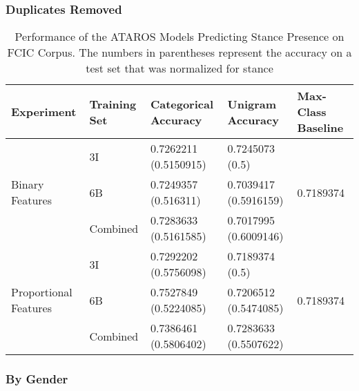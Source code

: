 \newpage 
\subsubsection*{Duplicates Removed}

\begin{table}[h]
\centering
\begin{tabular}{l | l | l | l | l  } 
	\textbf{Experiment}  & \textbf{Training Set} & \textbf{Categorical Accuracy} &  \textbf{Unigram Accuracy} & \textbf{Max-Class Baseline} \\ 
	\hline 
	\multirow{3}{*}{Binary Features}
		& 3I & \num{0.7262211} (\num{0.5150915}) & \num{0.7245073} (\num{0.5}) & \multirow{3}{*}{\num{0.7189374}} \\ 
	    & 6B & \num{0.7249357} (\num{0.516311}) & \num{0.7039417} (\num{0.5916159}) & \\ 
	    & Combined & \num{0.7283633} (\num{0.5161585}) & \num{0.7017995} (\num{0.6009146}) & \\  
	\hline
	\multirow{3}{*}{Proportional Features}
		& 3I & \num{0.7292202} (\num{0.5756098}) & \num{0.7189374} (\num{0.5}) & \multirow{3}{*}{\num{0.7189374}} \\ 
	    & 6B & \num{0.7527849} (\num{0.5224085}) & \num{0.7206512} (\num{0.5474085}) & \\ 
	    & Combined & \num{0.7386461} (\num{0.5806402}) & \num{0.7283633} (\num{0.5507622}) & \\  
\end{tabular}	
\caption{Performance of the ATAROS Models Predicting Stance Presence on FCIC Corpus.  The numbers in parentheses represent the accuracy on a test set that was normalized for stance} 
\label{tab:fcic_acc_SVN_nodupes} 
\end{table}

\newpage
\subsubsection*{By Gender} 
 
